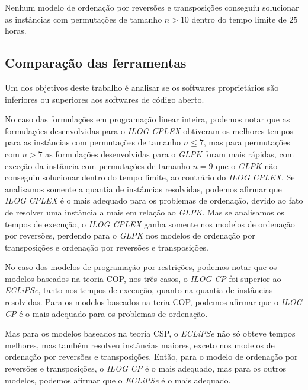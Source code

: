 Nenhum modelo de ordenação por reversões e transposições conseguiu
solucionar as instâncias com permutações de tamanho $n > 10$ dentro do
tempo limite de $25$ horas.



\subsection{Comparação das ferramentas}
\label{subsec:analise_ferramentas}
Um dos objetivos deste trabalho é analisar se os softwares
proprietários são inferiores ou superiores aos softwares de código
aberto.

No caso das formulações em programação linear inteira, podemos notar
que as formulações desenvolvidas para o \textit{ILOG CPLEX} obtiveram
os melhores tempos para as instâncias com permutações de tamanho
$n \le 7$, mas para permutações com $n > 7$ as formulações
desenvolvidas para o \textit{GLPK} foram mais rápidas, com exceção da
instância com permutações de tamanho $n = 9$ que o \textit{GLPK} não
conseguiu solucionar dentro do tempo limite, ao contrário
do \textit{ILOG CPLEX}. Se analisamos somente a quantia de instâncias
resolvidas, podemos afirmar que \textit{ILOG CPLEX} é o mais adequado
para os problemas de ordenação, devido ao fato de resolver uma
instância a mais em relação ao \textit{GLPK}. Mas se analisamos os
tempos de execução, o \textit{ILOG CPLEX} ganha somente nos modelos de
ordenação por reversões, perdendo para o \textit{GLPK} nos modelos de
ordenação por transposições e ordenação por reversões e transposições.

No caso dos modelos de programação por restrições, podemos notar que
os modelos baseados na teoria COP, nos três casos, o \textit{ILOG CP}
foi superior ao \textit{ECLiPSe}, tanto nos tempos de execução, quanto
na quantia de instâncias resolvidas. Para os modelos baseados na teria
COP, podemos afirmar que o \textit{ILOG CP} é o mais adequado para os
problemas de ordenação.

Mas para os modelos baseados na teoria CSP, o \textit{ECLiPSe} não só
obteve tempos melhores, mas também resolveu instâncias maiores, exceto
nos modelos de ordenação por reversões e transposições. Então, para o
modelo de ordenação por reversões e transposições, o \textit{ILOG CP}
é o mais adequado, mas para os outros modelos, podemos afirmar que
o \textit{ECLiPSe} é o mais adequado.
